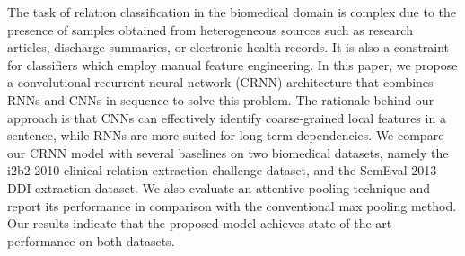 The task of relation classification in the biomedical domain is complex due to the presence of samples obtained from heterogeneous sources such as research articles, discharge summaries, or electronic health records. It is also a constraint for classifiers which employ manual feature engineering. In this paper, we propose a convolutional recurrent neural network (CRNN) architecture that combines RNNs and CNNs in sequence to solve this problem. The rationale behind our approach is that CNNs can effectively identify coarse-grained local features in a sentence, while RNNs are more suited for long-term dependencies. We compare our CRNN model with several baselines on two biomedical datasets, namely the i2b2-2010 clinical relation extraction challenge dataset, and the SemEval-2013 DDI extraction dataset. We also evaluate an attentive pooling technique and report its performance in comparison with the conventional max pooling method. Our results indicate that the proposed model achieves state-of-the-art performance on both datasets.
